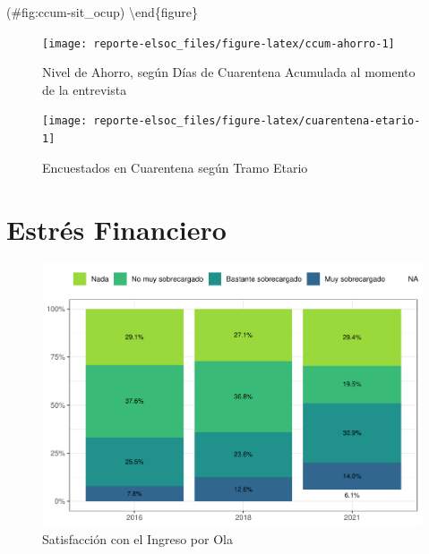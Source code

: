 \documentclass[
  12pt,
  openany]{book}
\begin{document}
(\#fig:ccum-sit\_ocup)
\textbackslash end\{figure\}

\begin{figure}

{\centering \texttt{[image: reporte-elsoc\_files/figure-latex/ccum-ahorro-1]} 

}

\caption{Nivel de Ahorro, según Días de Cuarentena Acumulada al momento de la entrevista}\label{fig:ccum-ahorro}
\end{figure}

\begin{figure}

{\centering \texttt{[image: reporte-elsoc\_files/figure-latex/cuarentena-etario-1]} 

}

\caption{Encuestados en Cuarentena según Tramo Etario}\label{fig:cuarentena-etario}
\end{figure}

\hypertarget{estruxe9s-financiero}{%
\section{Estrés Financiero}\label{estruxe9s-financiero}}

\begin{figure}

{\centering \includegraphics{reporte-elsoc_files/figure-latex/satisfaccion-wave-1} 

}

\caption{Satisfacción con el Ingreso por Ola}\label{fig:satisfaccion-wave}
\end{figure}
\end{document}
